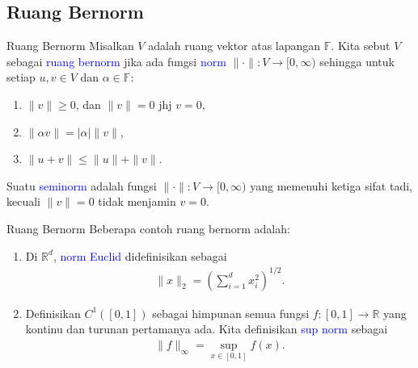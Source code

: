 \documentclass[xcolor={dvipsnames}, 9pt]{beamer}
\renewcommand{\emph}[1]{\textcolor{Blue}{#1}}
\begin{document}
	\subsection{Ruang Bernorm}
    \begin{frame}{Ruang Bernorm}
        Misalkan $V$ adalah ruang vektor atas lapangan $\mathbb{F}$. Kita sebut $V$ sebagai \emph{ruang bernorm} jika ada fungsi \emph{norm} $\|\cdot\|:V\to [0,\infty)$ sehingga untuk setiap $u,v\in V$ dan $\alpha\in\mathbb{F}$:
        \begin{enumerate}
            \item $\|v\|\geq 0$, dan $\|v\|=0$ jhj $v=0$,
            \item $\|\alpha v\|=|\alpha|\|v\|$,
            \item $\|u+v\|\leq\|u\|+\|v\|$.
        \end{enumerate}
        Suatu \emph{seminorm} adalah fungsi $\|\cdot\|:V\to[0,\infty)$ yang memenuhi ketiga sifat tadi, kecuali $\|v\|=0$ tidak menjamin $v=0$.
    \end{frame}
    \begin{frame}{Ruang Bernorm}
        Beberapa contoh ruang bernorm adalah:
        \begin{enumerate}
            \item Di $\mathbb{R}^d$, \emph{norm Euclid} didefinisikan sebagai
            \begin{align*}
                \|x\|_2 = \left(\sum_{i=1}^d x_i^2\right)^{1/2}.
            \end{align*}
            \item Definisikan $C^1([0,1])$ sebagai himpunan semua fungsi $f:[0,1]\to\mathbb{R}$ yang kontinu dan turunan pertamanya ada. Kita definisikan \emph{sup norm} sebagai
            \begin{align*}
            	\|f\|_\infty = \sup_{x\in[0,1]}f(x).
            \end{align*}
        \end{enumerate}
    \end{frame}
\end{document}
